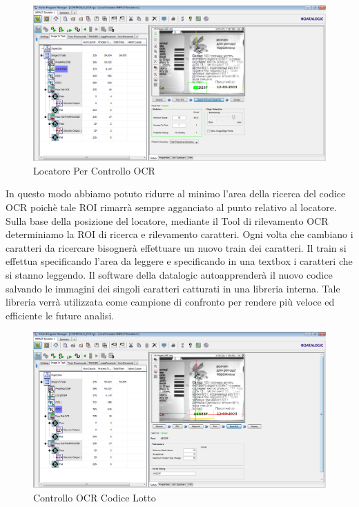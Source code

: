 \documentclass[12pt, a4paper, oneside]{book}
\begin{document}
\begin{itemize}
		\begin{figure}[H]
		\centering
		\includegraphics[width=13cm]{Immagini/VIS9}
		\caption{Locatore Per Controllo OCR}
		\label{vis9}
	\end{figure}

In questo modo abbiamo potuto ridurre al minimo l'area della ricerca del codice OCR poichè tale ROI rimarrà sempre agganciato al punto relativo al locatore.
Sulla base della posizione del locatore, mediante il Tool di rilevamento OCR determiniamo la ROI di ricerca e rilevamento caratteri. Ogni volta che cambiano i caratteri da ricercare bisognerà effettuare un nuovo train dei caratteri. Il train si effettua specificando l'area da leggere e specificando in una textbox i caratteri che si stanno leggendo. Il software della datalogic autoapprenderà il nuovo codice salvando le immagini dei singoli caratteri catturati in una libreria interna. Tale libreria verrà utilizzata come campione di confronto per rendere più veloce ed efficiente le future analisi. 

		\begin{figure}[H]
	\centering
	\includegraphics[width=13cm]{Immagini/VIS10}
	\caption{Controllo OCR Codice Lotto}
	\label{vis10}
\end{figure}


\end{itemize}
\end{document}
